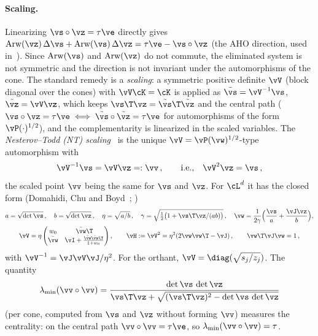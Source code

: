 \paragraph{Scaling.} Linearizing $\vs\circ\vz = \tau\ve$ directly gives $\operatorname{Arw}(\vz)\,\Delta\vs + \operatorname{Arw}(\vs)\,\Delta\vz = \tau\ve - \vs\circ\vz$ (the AHO direction, used in~\cite{Acary2026}). Since $\operatorname{Arw}(\vs)$ and $\operatorname{Arw}(\vz)$ do not commute, the eliminated system is not symmetric and the direction is not invariant under the automorphisms of the cone. The standard remedy is a \emph{scaling}: a symmetric positive definite $\vV$ (block diagonal over the cones) with $\vV\cK = \cK$ is applied as $\tilde{\vs} = \vV^{-1}\vs$, $\tilde{\vz} = \vV\vz$, which keeps $\vs\T\vz = \tilde{\vs}\T\tilde{\vz}$ and the central path ($\vs\circ\vz = \tau\ve \iff \tilde{\vs}\circ\tilde{\vz} = \tau\ve$ for automorphisms of the form $\vP(\cdot)^{1/2}$), and the complementarity is linearized in the scaled variables. The \emph{Nesterov--Todd (NT) scaling}~\cite{Nesterov1997, Nesterov1998} is the unique $\vV = \vP(\vw)^{1/2}$-type automorphism with
%
\begin{equation}\label{eq:ec_nt}
	\vV^{-1}\vs = \vV\vz =: \vv \, , \qquad \text{i.e.,} \quad \vV^2\vz = \vs \, ,
\end{equation}
%
the scaled point $\vv$ being the same for $\vs$ and $\vz$. For $\cL^d$ it has the closed form (Domahidi, Chu and Boyd~\cite{Domahidi2013}; )
%
\begin{equation}\label{eq:ec_nt_formula}
	\begin{gathered}
		a = \sqrt{\det\vs} \, , \quad b = \sqrt{\det\vz} \, , \quad \eta = \sqrt{a/b} \, , \quad
		\gamma = \sqrt{\tfrac{1}{2}\big(1 + \vs\T\vz/(ab)\big)} \, , \quad
		\vw = \frac{1}{2\gamma}\Big(\frac{\vs}{a} + \frac{\vJ\vz}{b}\Big) , \\
		\vV = \eta\begin{pmatrix} w_0 & \bar{\vw}\T \\ \bar{\vw} & \vI + \frac{\bar{\vw}\bar{\vw}\T}{1 + w_0} \end{pmatrix} , \qquad
		\vH := \vV^2 = \eta^2(2\vw\vw\T - \vJ) \, , \qquad \vw\T\vJ\vw = 1 \, ,
	\end{gathered}
\end{equation}
%
with $\vV^{-1} = \vJ\vV\vJ/\eta^2$. For the orthant, $\vV = \diag(\sqrt{s_j/z_j})$. The quantity
%
\begin{equation}\label{eq:ec_centrality}
	\lambda_{\min}(\vv\circ\vv) = \frac{\det\vs\,\det\vz}{\vs\T\vz + \sqrt{(\vs\T\vz)^2 - \det\vs\,\det\vz}}
\end{equation}
%
(per cone, computed from $\vs$ and $\vz$ without forming $\vv$) measures the centrality: on the central path $\vv\circ\vv = \tau\ve$, so $\lambda_{\min}(\vv\circ\vv) = \tau$.
%
